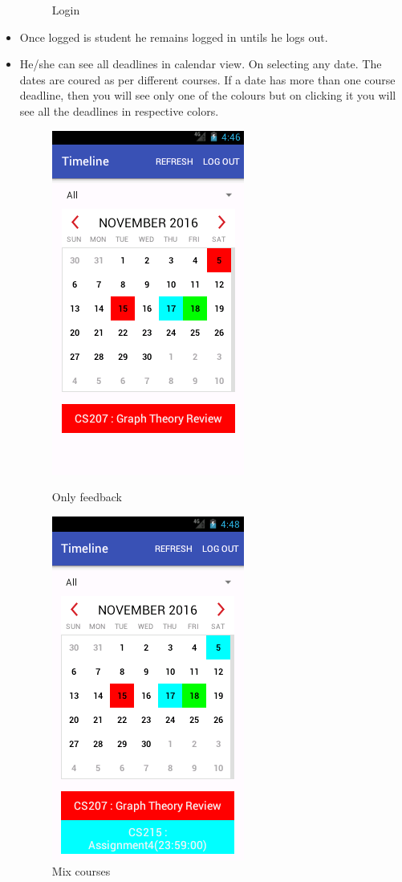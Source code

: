 \documentclass[12pt]{extreport}
\begin{document}
\begin{itemize}
\begin{figure}[ht!]
\begin{minipage}{.5\textwidth}
      \caption{Login \label{overflow}}
    \end{minipage}%
  \end{figure}
  \item Once logged is student he remains logged in untils he logs out. 
  \item He/she can see all deadlines in calendar view. On selecting any date. The dates are coured as per different courses. If a date has more than one course deadline, then you will see only one of the colours but on clicking it you will see all the deadlines in respective colors.
  \begin{figure}[ht!]
    \centering
    \begin{minipage}{.3\textwidth}
      \centering
      \includegraphics[width=.3\linewidth]{images/calendar.png}
      \caption{Only feedback\label{overflow}}
    \end{minipage}%
    \begin{minipage}{.3\textwidth}
      \centering
      \includegraphics[width=.3\linewidth]{images/calendarMix.png}
      \caption{Mix courses\label{overflow}}
    \end{minipage}%

\end{figure}
\end{itemize}
\end{document}
